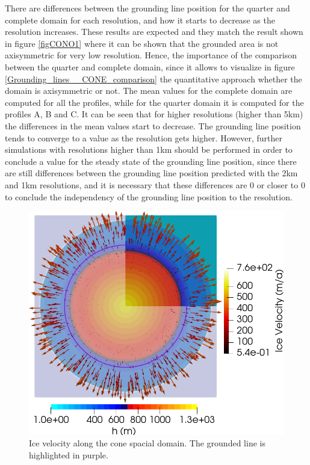 \documentclass{article}
\begin{document}
There are differences between the grounding line position for the quarter and complete domain for each resolution, and how it starts to decrease as the resolution increases. These results are expected and they match the result shown in figure \ref{figCONO1} where it can be shown that the grounded area is not axisymmetric for very low resolution. Hence, the importance of the comparison between the quarter and complete domain, since it allows to visualize in figure \ref{Grounding_lines__CONE_comparison} the quantitative approach whether the domain is axisymmetric or not. The mean values for the complete domain are computed for all the profiles, while for the quarter domain it is computed for the profiles A, B and C. It can be seen that for higher resolutions (higher than 5km) the differences in the mean values start to decrease. The grounding line position tends to converge to a value as the resolution gets higher. However, further simulations with resolutions higher than 1km should be performed in order to conclude a value for the steady state of the grounding line position, since there are still differences between the grounding line position predicted with the 2km and 1km resolutions, and it is necessary that these differences are 0 or closer to 0 to conclude the independency of the grounding line position to the resolution. 

\begin{figure}[!h]
	\centering
	\includegraphics[width=0.6\linewidth]{../fig/Grounding_line_integrated_full_domain-quarter-_CONE_time.png}
	\caption{Ice velocity along the cone spacial domain. The grounded line is highlighted in purple.}
	\label{SSA_velocity}
\end{figure}
\end{document}
